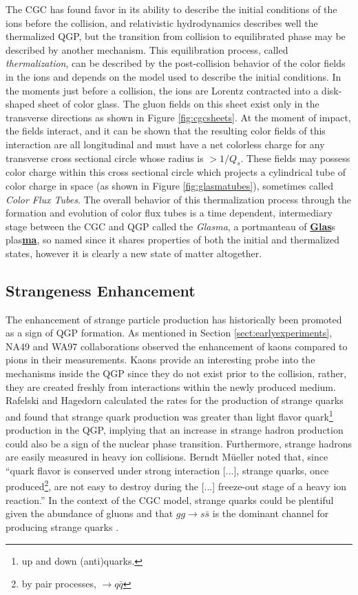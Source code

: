 The CGC has found favor in its ability to describe the initial conditions of the ions before the collision, and relativistic hydrodynamics describes well the thermalized QGP, but the transition from collision to equilibrated phase may be described by another mechanism. This equilibration process, called \textit{thermalization}, can be described by the post-collision behavior of the color fields in the ions \citep{Fujii:2008dd} and depends on the model used to describe the initial conditions. In the moments just before a collision, the ions are Lorentz contracted into a disk-shaped sheet of color glass. The gluon fields on this sheet exist only in the transverse directions as shown in Figure \ref{fig:cgcsheets}. At the moment of impact, the fields interact, and it can be shown \citep{Fries:2006pv} that the resulting color fields of this interaction are all longitudinal and must have a net colorless charge for any transverse cross sectional circle whose radius is $> 1/Q_s$. These fields may possess color charge within this cross sectional circle which projects a cylindrical tube of color charge in space (as shown in Figure \ref{fig:glasmatubes}), sometimes called \textit{Color Flux Tubes}. The overall behavior of this thermalization process through the formation and evolution of color flux tubes is a time dependent, intermediary stage between the CGC and QGP called the \textit{Glasma}, a portmanteau of \underline{\textbf{Glas}}s plas\underline{\textbf{ma}}, so named since it shares properties of both the initial and thermalized states, however it is clearly a new state of matter altogether.

\subsection{Strangeness Enhancement}
The enhancement of strange particle production has historically been promoted as a sign of QGP formation. As mentioned in Section \ref{sect:earlyexperiments}, NA49 and WA97 collaborations observed the enhancement of kaons compared to pions in their measurements. Kaons provide an interesting probe into the mechanisms inside the QGP since they do not exist prior to the collision, rather, they are created freshly from interactions within the newly produced medium. Rafelski and Hagedorn calculated the rates for the production of strange quarks\citep{statmechofquarks} and found that strange quark production was greater than light flavor quark\footnote{up and down (anti)quarks.} production in the QGP, implying that an increase in strange hadron production could also be a sign of the nuclear phase transition. Furthermore, strange hadrons are easily measured in heavy ion collisions. Berndt M\"ueller noted that, since ``quark flavor is conserved under strong interaction [...], strange quarks, once produced\footnote{by pair processes, $\rightarrow q\bar{q}$}, are not easy to destroy during the [...] freeze-out stage of a heavy ion reaction.'' \citep{Muller:2011tu} In the context of the CGC model, strange quarks could be plentiful given the abundance of gluons and that $gg \rightarrow s \bar{s}$ is the dominant channel for producing strange quarks \citep{PhysRevLett.48.1066}.

